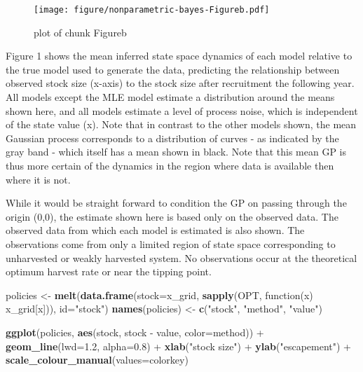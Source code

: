\documentclass[author-year, review]{elsarticle} %
\makeatletter
\newenvironment{Shaded}{}{}
\newcommand{\KeywordTok}[1]{\textcolor[rgb]{0.00,0.44,0.13}{\textbf{{#1}}}}
\newcommand{\DataTypeTok}[1]{\textcolor[rgb]{0.56,0.13,0.00}{{#1}}}
\newcommand{\FloatTok}[1]{\textcolor[rgb]{0.25,0.63,0.44}{{#1}}}
\newcommand{\StringTok}[1]{\textcolor[rgb]{0.25,0.44,0.63}{{#1}}}
\newcommand{\NormalTok}[1]{{#1}}
\def\maxwidth{\ifdim\Gin@nat@width>\linewidth\linewidth
\else\Gin@nat@width\fi}
\let\Oldincludegraphics\includegraphics
\renewcommand{\includegraphics}[1]{\Oldincludegraphics[width=\maxwidth]{#1}}
\makeatother
\begin{document}
\begin{figure}[htbp]
\centering
\texttt{[image: figure/nonparametric-bayes-Figureb.pdf]}
\caption{plot of chunk Figureb}
\end{figure}

Figure 1 shows the mean inferred state space dynamics of each model
relative to the true model used to generate the data, predicting the
relationship between observed stock size (x-axis) to the stock size
after recruitment the following year. All models except the MLE model
estimate a distribution around the means shown here, and all models
estimate a level of process noise, which is independent of the state
value (x). Note that in contrast to the other models shown, the mean
Gaussian process corresponds to a distribution of curves - as indicated
by the gray band - which itself has a mean shown in black. Note that
this mean GP is thus more certain of the dynamics in the region where
data is available then where it is not.

While it would be straight forward to condition the GP on passing
through the origin (0,0), the estimate shown here is based only on the
observed data. The observed data from which each model is estimated is
also shown. The observations come from only a limited region of state
space corresponding to unharvested or weakly harvested system. No
observations occur at the theoretical optimum harvest rate or near the
tipping point.

\begin{Shaded}
\begin{Highlighting}[]
\NormalTok{policies <-}\StringTok{ }\KeywordTok{melt}\NormalTok{(}\KeywordTok{data.frame}\NormalTok{(}\DataTypeTok{stock=}\NormalTok{x_grid, }\KeywordTok{sapply}\NormalTok{(OPT, function(x) x_grid[x])), }\DataTypeTok{id=}\StringTok{"stock"}\NormalTok{)}
\KeywordTok{names}\NormalTok{(policies) <-}\StringTok{ }\KeywordTok{c}\NormalTok{(}\StringTok{"stock"}\NormalTok{, }\StringTok{"method"}\NormalTok{, }\StringTok{"value"}\NormalTok{)}

\KeywordTok{ggplot}\NormalTok{(policies, }\KeywordTok{aes}\NormalTok{(stock, stock -}\StringTok{ }\NormalTok{value, }\DataTypeTok{color=}\NormalTok{method)) +}
\StringTok{  }\KeywordTok{geom_line}\NormalTok{(}\DataTypeTok{lwd=}\FloatTok{1.2}\NormalTok{, }\DataTypeTok{alpha=}\FloatTok{0.8}\NormalTok{) +}\StringTok{ }\KeywordTok{xlab}\NormalTok{(}\StringTok{"stock size"}\NormalTok{) +}\StringTok{ }\KeywordTok{ylab}\NormalTok{(}\StringTok{"escapement"}\NormalTok{)  +}
\StringTok{  }\KeywordTok{scale_colour_manual}\NormalTok{(}\DataTypeTok{values=}\NormalTok{colorkey)}
\end{Highlighting}
\end{Shaded}
\end{document}
